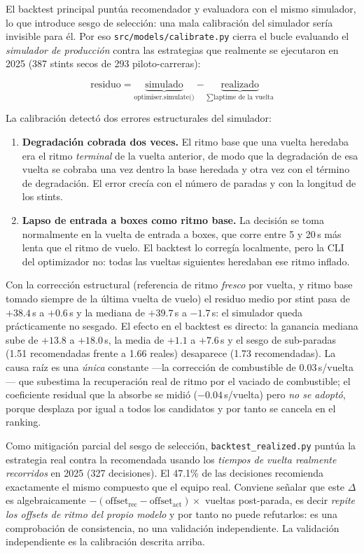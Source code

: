 \documentclass[conference]{IEEEtran}
\begin{document}
El backtest principal puntúa recomendador y evaluadora con el mismo
simulador, lo que introduce sesgo de selección: una mala calibración del
simulador sería invisible para él. Por eso \texttt{src/models/calibrate.py}
cierra el bucle evaluando el \emph{simulador de producción} contra las
estrategias que realmente se ejecutaron en 2025 (387 stints secos de 293
piloto-carreras):

\[
\text{residuo} = \underbrace{\text{simulado}}_{\text{optimiser.simulate()}}
- \underbrace{\text{realizado}}_{\textstyle\sum \text{laptime} \text{ de la vuelta}}
\]

La calibración detectó dos errores estructurales del simulador:

\begin{enumerate}
  \item \textbf{Degradación cobrada dos veces.} El ritmo base que una
        vuelta heredaba era el ritmo \emph{terminal} de la vuelta anterior,
        de modo que la degradación de esa vuelta se cobraba una vez dentro
        la base heredada y otra vez con el término de degradación. El error
        crecía con el número de paradas y con la longitud de los stints.
  \item \textbf{Lapso de entrada a boxes como ritmo base.} La decisión se
        toma normalmente en la vuelta de entrada a boxes, que corre entre
        5 y 20\,s más lenta que el ritmo de vuelo. El backtest lo corregía
        localmente, pero la CLI del optimizador no: todas las vueltas
        siguientes heredaban ese ritmo inflado.
\end{enumerate}

Con la corrección estructural (referencia de ritmo \emph{fresco} por
vuelta, y ritmo base tomado siempre de la última vuelta de vuelo) el
residuo medio por stint pasa de $+38.4$\,s a $\mathbf{+0.6}$\,s y la
mediana de $+39.7$\,s a $\mathbf{-1.7}$\,s: el simulador queda
prácticamente no sesgado. El efecto en el backtest es directo: la ganancia
mediana sube de $+13.8$ a $+18.0$\,s, la media de $+1.1$ a $+7.6$\,s y
el sesgo de sub-paradas (1.51 recomendadas frente a 1.66 reales)
desaparece (1.73 recomendadas). La causa raíz es una \emph{única} constante
—la corrección de combustible de 0.03\,s/vuelta— que subestima la
recuperación real de ritmo por el vaciado de combustible; el coeficiente
residual que la absorbe se midió ($-0.04$\,s/vuelta) pero \emph{no se
adoptó}, porque desplaza por igual a todos los candidatos y por tanto se
cancela en el ranking.

Como mitigación parcial del sesgo de selección,
\texttt{backtest\_realized.py} puntúa la estrategia real contra la
recomendada usando los \emph{tiempos de vuelta realmente recorridos} en 2025
(327 decisiones). El 47.1\% de las decisiones recomienda exactamente el
mismo compuesto que el equipo real. Conviene señalar que este $\Delta$ es
algebraicamente $-(\text{offset}_{\text{rec}}-\text{offset}_{\text{act}})
\times$ vueltas post-parada, es decir \emph{repite los offsets de ritmo del
propio modelo} y por tanto no puede refutarlos: es una comprobación de
consistencia, no una validación independiente. La validación independiente
es la calibración descrita arriba.
\end{document}
